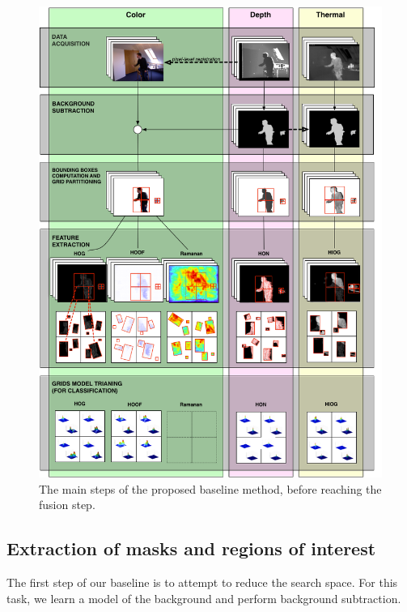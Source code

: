 \documentclass[10pt,twocolumn,letterpaper]{article}
\begin{document}
\begin{figure}[ht!]
	\centering
	\includegraphics[width=\linewidth]{pictures/diagram.png}
	\caption{The main steps of the proposed baseline method, before reaching the fusion step.}
	\label{fig:baseline}
\end{figure}


\subsection{Extraction of masks and regions of interest} 
\label{ssec:bsbb}

The first step of our baseline is to attempt to reduce the search space. For this task, we learn a model of the background and perform background subtraction.
\end{document}
